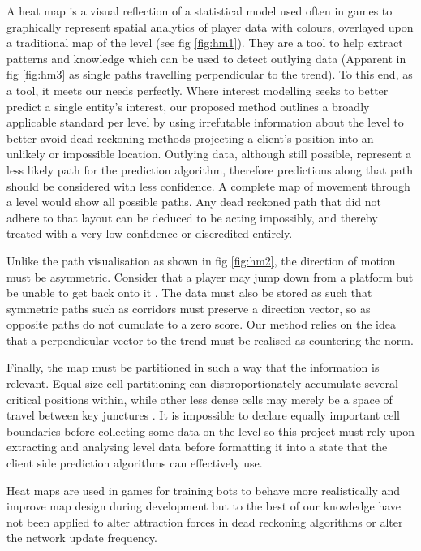 \documentclass[journal]{IEEEtran}
\begin{document}
A heat map is a visual reflection of a statistical model \cite{wilkinson2009history} used often in games to graphically represent spatial analytics of player data with colours, overlayed upon a traditional map of the level (see fig \ref{fig:hm1}). They are a tool to help extract patterns and knowledge which can be used to detect outlying data \cite{drachen2013spatial} (Apparent in fig \ref{fig:hm3} as single paths travelling perpendicular to the trend). To this end, as a tool, it meets our needs perfectly. Where interest modelling seeks to better predict a single entity's interest,
our proposed method outlines a broadly applicable standard per level by using irrefutable information about the level to better avoid dead reckoning methods projecting a client's position into an unlikely or impossible location. Outlying data, although still possible, represent a less likely path for the prediction algorithm, therefore predictions along that path should be considered with less confidence. A complete map of movement through a level would show all possible paths. Any dead reckoned path that did not adhere to that layout can be deduced to be acting impossibly, and thereby treated with a very low confidence or discredited entirely.

Unlike the path visualisation as shown in fig \ref{fig:hm2}, the direction of motion must be asymmetric. Consider that a player may jump down from a platform but be unable to get back onto it \cite{bauckhage2014beyond}. The data must also be stored as such that symmetric paths such as corridors must preserve a direction vector, so as opposite paths do not cumulate to a zero score. Our method relies on the idea that a perpendicular vector to the trend must be realised as countering the norm.

Finally, the map must be partitioned in such a way that the information is relevant. Equal size cell partitioning can disproportionately accumulate several critical positions within, while other less dense cells may merely be a space of travel between key junctures \cite{steed2003partitioning}. It is impossible to declare equally important cell boundaries before collecting some data on the level so this project must rely upon extracting and analysing level data before formatting it into a state that the client side prediction algorithms can effectively use.

Heat maps are used in games for training bots to behave more realistically and improve map design during development \cite{bauckhage2014beyond} but to the best of our knowledge have not been applied to alter attraction forces in dead reckoning algorithms or alter the network update frequency.
\end{document}

